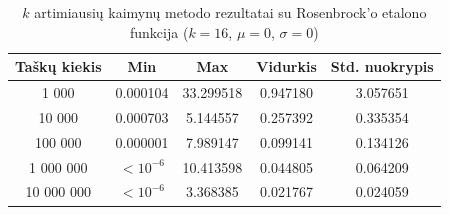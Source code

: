 \begin{table}[H]
    \centering
    \begin{tabular}{|c|c|c|c|c|}
        \hline
        \textbf{Taškų kiekis} & \textbf{Min} & \textbf{Max} & \textbf{Vidurkis} & \textbf{Std. nuokrypis} \\ \hline
        1 000        & 0.000104 & 33.299518 & 0.947180 & 3.057651 \\ \hline
        10 000       & 0.000703 & 5.144557 & 0.257392 & 0.335354 \\ \hline
        100 000      & 0.000001 & 7.989147 & 0.099141 & 0.134126 \\ \hline
        1 000 000    & $<10^{-6}$ & 10.413598 & 0.044805 & 0.064209 \\ \hline
        10 000 000   & $<10^{-6}$ & 3.368385 & 0.021767 & 0.024059 \\ \hline
    \end{tabular}
    \caption{$k$ artimiausių kaimynų metodo rezultatai su Rosenbrock'o etalono funkcija ($k = 16$, $\mu = 0$, $\sigma = 0$)}
\end{table}